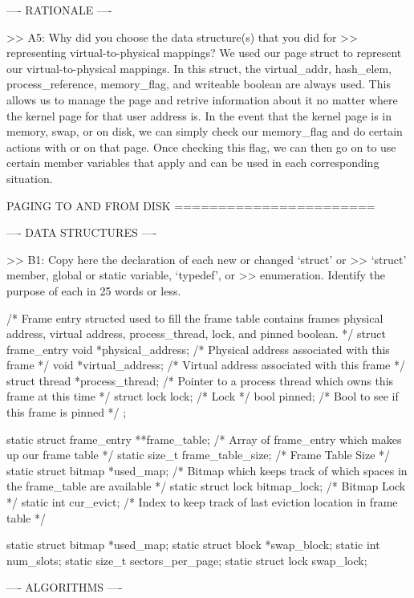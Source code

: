 ---- RATIONALE ----

>> A5: Why did you choose the data structure(s) that you did for
>> representing virtual-to-physical mappings?
We used our page struct to represent our virtual-to-physical mappings. In
this struct, the virtual_addr, hash_elem, process_reference, memory_flag, 
and writeable boolean are always used. This allows us to manage the page 
and retrive information about it no matter where the kernel page for that 
user address is. In the event that the kernel page is in memory, swap, or 
on disk, we can simply check our memory_flag and do certain actions with
or on that page. Once checking this flag, we can then go on to use certain 
member variables that apply and can be used in each corresponding
situation.

               PAGING TO AND FROM DISK
               =======================

---- DATA STRUCTURES ----

>> B1: Copy here the declaration of each new or changed `struct' or
>> `struct' member, global or static variable, `typedef', or
>> enumeration.  Identify the purpose of each in 25 words or less.

/* Frame entry structed used to fill the frame table 
contains frames physical address, virtual address,
process_thread, lock, and pinned boolean. */
struct frame_entry
{
    void *physical_address;         /* Physical address associated with this frame */
    void *virtual_address;          /* Virtual address associated with this frame */
    struct thread *process_thread;  /* Pointer to a process thread which owns this frame at this time */
    struct lock lock;               /* Lock */
    bool pinned;                    /* Bool to see if this frame is pinned */
};

static struct frame_entry **frame_table;    /* Array of frame_entry which makes up our frame table */
static size_t frame_table_size;             /* Frame Table Size */
static struct bitmap *used_map;             /* Bitmap which keeps track of which spaces in the frame_table are available */
static struct lock bitmap_lock;             /* Bitmap Lock */
static int cur_evict;                       /* Index to keep track of last eviction location in frame table */

static struct bitmap *used_map;
static struct block *swap_block;
static int num_slots;
static size_t sectors_per_page;
static struct lock swap_lock;

---- ALGORITHMS ----

